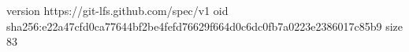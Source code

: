 version https://git-lfs.github.com/spec/v1
oid sha256:e22a47cfd0ca77644bf2be4fefd76629f664d0c6dc0fb7a0223e2386017c85b9
size 83
